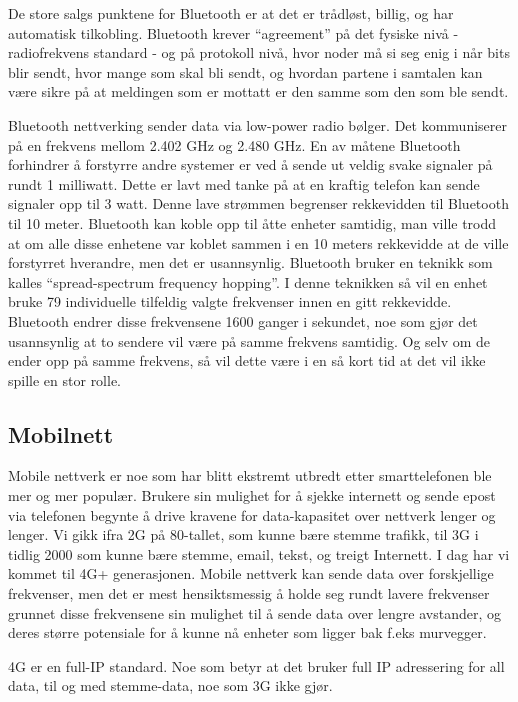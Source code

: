\documentclass{article}
\begin{document}
De store salgs punktene for Bluetooth er at det er trådløst, billig, og har automatisk tilkobling. Bluetooth krever “agreement” på det fysiske nivå - radiofrekvens standard - og på protokoll nivå, hvor noder må si seg enig i når bits blir sendt, hvor mange som skal bli sendt, og hvordan partene i samtalen kan være sikre på at meldingen som er mottatt er den samme som den som ble sendt.

Bluetooth nettverking sender data via low-power radio bølger. Det kommuniserer på en frekvens mellom 2.402 GHz og 2.480 GHz.  En av måtene Bluetooth forhindrer å forstyrre andre systemer er ved å sende ut veldig svake signaler på rundt 1 milliwatt. Dette er lavt med tanke på at en kraftig telefon kan sende signaler opp til 3 watt. Denne lave strømmen begrenser rekkevidden til Bluetooth til 10 meter. Bluetooth kan koble opp til åtte enheter samtidig, man ville trodd at om alle disse enhetene var koblet sammen i en 10 meters rekkevidde at de ville forstyrret hverandre, men det er usannsynlig. Bluetooth bruker en teknikk som kalles “spread-spectrum frequency hopping”. I denne teknikken så vil en enhet bruke 79 individuelle tilfeldig valgte frekvenser innen en gitt rekkevidde. Bluetooth endrer disse frekvensene 1600 ganger i sekundet, noe som gjør det usannsynlig at to sendere vil være på samme frekvens samtidig. Og selv om de ender opp på samme frekvens, så vil dette være i en så kort tid at det vil ikke spille en stor rolle.



\subsection{Mobilnett}
Mobile nettverk er noe som har blitt ekstremt utbredt etter smarttelefonen ble mer og mer populær. Brukere sin mulighet for å sjekke internett og sende epost via telefonen begynte å drive kravene for data-kapasitet over nettverk lenger og lenger. Vi gikk ifra 2G på 80-tallet, som kunne bære stemme trafikk, til 3G i tidlig 2000 som kunne bære stemme, email, tekst, og treigt Internett. I dag har vi kommet til 4G+ generasjonen. Mobile nettverk kan sende data over forskjellige frekvenser, men det er mest hensiktsmessig å holde seg rundt lavere frekvenser grunnet disse frekvensene sin mulighet til å sende data over lengre avstander, og deres større potensiale for å kunne nå enheter som ligger bak f.eks murvegger.

4G er en full-IP standard. Noe som betyr at det bruker full IP adressering for all data, til og med stemme-data, noe som 3G ikke gjør.
\end{document}
